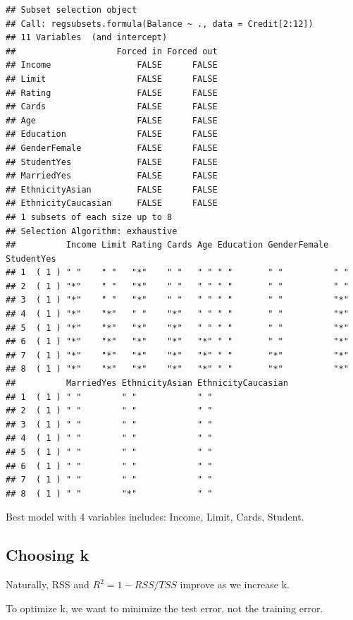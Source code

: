 \documentclass[
]{article}
\begin{document}
\begin{verbatim}
## Subset selection object
## Call: regsubsets.formula(Balance ~ ., data = Credit[2:12])
## 11 Variables  (and intercept)
##                    Forced in Forced out
## Income                 FALSE      FALSE
## Limit                  FALSE      FALSE
## Rating                 FALSE      FALSE
## Cards                  FALSE      FALSE
## Age                    FALSE      FALSE
## Education              FALSE      FALSE
## GenderFemale           FALSE      FALSE
## StudentYes             FALSE      FALSE
## MarriedYes             FALSE      FALSE
## EthnicityAsian         FALSE      FALSE
## EthnicityCaucasian     FALSE      FALSE
## 1 subsets of each size up to 8
## Selection Algorithm: exhaustive
##          Income Limit Rating Cards Age Education GenderFemale StudentYes
## 1  ( 1 ) " "    " "   "*"    " "   " " " "       " "          " "       
## 2  ( 1 ) "*"    " "   "*"    " "   " " " "       " "          " "       
## 3  ( 1 ) "*"    " "   "*"    " "   " " " "       " "          "*"       
## 4  ( 1 ) "*"    "*"   " "    "*"   " " " "       " "          "*"       
## 5  ( 1 ) "*"    "*"   "*"    "*"   " " " "       " "          "*"       
## 6  ( 1 ) "*"    "*"   "*"    "*"   "*" " "       " "          "*"       
## 7  ( 1 ) "*"    "*"   "*"    "*"   "*" " "       "*"          "*"       
## 8  ( 1 ) "*"    "*"   "*"    "*"   "*" " "       "*"          "*"       
##          MarriedYes EthnicityAsian EthnicityCaucasian
## 1  ( 1 ) " "        " "            " "               
## 2  ( 1 ) " "        " "            " "               
## 3  ( 1 ) " "        " "            " "               
## 4  ( 1 ) " "        " "            " "               
## 5  ( 1 ) " "        " "            " "               
## 6  ( 1 ) " "        " "            " "               
## 7  ( 1 ) " "        " "            " "               
## 8  ( 1 ) " "        "*"            " "
\end{verbatim}

Best model with 4 variables includes: Income, Limit, Cards, Student.

\hypertarget{choosing-k}{%
\subsection{Choosing k}\label{choosing-k}}

Naturally, RSS and \(R^2=1−RSS/TSS\) improve as we increase k.

To optimize k, we want to minimize the test error, not the training
error.
\end{document}
